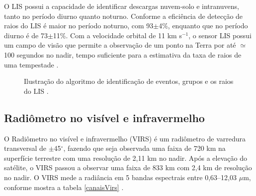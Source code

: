      
O LIS possui a capacidade de identificar descargas nuvem-solo e intranuvens, tanto no período diurno quanto noturno. Conforme  a eficiência de detecção de raios do LIS é maior no período noturno, com 93$\pm$4\%, enquanto que no período diurno é de 73$\pm$11\%.  Com a velocidade orbital de 11 km s$^{-1}$, o sensor LIS possui um campo de visão que permite a observação de um ponto na Terra por até $\simeq$100 segundos no nadir, tempo suficiente para a estimativa da taxa de raios de uma tempestade \cite{christianTM,trmmhandbook}.


\begin{figure}[!ht]
\caption{Ilustração do algoritmo de identificação de eventos, grupos e os raios do LIS \cite{christian2000LISalgorithm}.}
\label{LisImagemProcessa} 
\end{figure} 


\subsection{Radiômetro no visível e infravermelho}

O Radiômetro no visível e infravermelho (VIRS) é um radiômetro de varredura transversal de $\pm$45$^{\circ}$, fazendo que seja observada uma faixa de 720 km  na superfície terrestre com uma resolução de 2,11 km no nadir. Após a elevação do satélite, o VIRS passou a observar uma faixa de 833 km com 2,4 km de resolução no nadir. O VIRS mede a radiância em 5 bandas espectrais entre 0,63--12,03 $\mu$m, conforme mostra a tabela \ref{canaisVirs} \cite{kummerok1998}.

